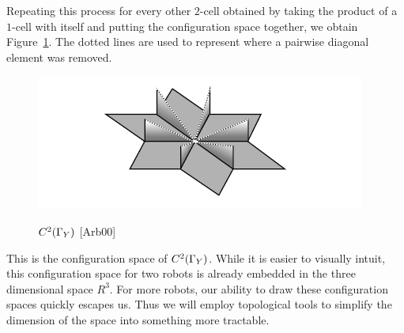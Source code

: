Repeating this process for every other $2$-cell obtained by taking the product of a $1$-cell with itself and putting the configuration space together, we obtain Figure~\ref{fig:config}. The dotted lines are used to represent where a pairwise diagonal element was removed.

\begin{figure}[h]
\centering
\caption{$C^2(\Gamma_Y)$ [Arb00]}
\includegraphics[scale=1]{Presentation/Config.jpg}
\label{fig:config}
\end{figure}

This is the configuration space of $C^2(\Gamma_Y)$. While it is easier to visually intuit, this configuration space for two robots is already embedded in the three dimensional space $R^3$. For more robots, our ability to draw these configuration spaces quickly escapes us. Thus we will employ topological tools to simplify the dimension of the space into something more tractable.